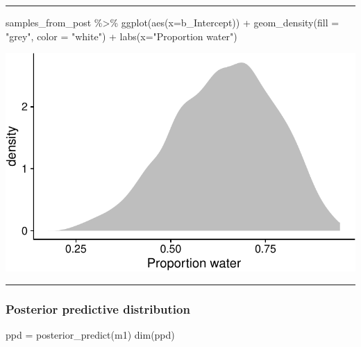 \documentclass[
  letterpaper,
  DIV=11,
  numbers=noendperiod]{scrartcl}
\newenvironment{Shaded}{\begin{snugshade}}{\end{snugshade}}
\newcommand{\AttributeTok}[1]{\textcolor[rgb]{0.40,0.45,0.13}{#1}}
\newcommand{\FunctionTok}[1]{\textcolor[rgb]{0.28,0.35,0.67}{#1}}
\newcommand{\NormalTok}[1]{\textcolor[rgb]{0.00,0.23,0.31}{#1}}
\newcommand{\OtherTok}[1]{\textcolor[rgb]{0.00,0.23,0.31}{#1}}
\newcommand{\SpecialCharTok}[1]{\textcolor[rgb]{0.37,0.37,0.37}{#1}}
\newcommand{\StringTok}[1]{\textcolor[rgb]{0.13,0.47,0.30}{#1}}
\begin{document}
\begin{center}\rule{0.5\linewidth}{0.5pt}\end{center}

\begin{Shaded}
\begin{Highlighting}[]
\NormalTok{samples\_from\_post }\SpecialCharTok{\%\textgreater{}\%}  
  \FunctionTok{ggplot}\NormalTok{(}\FunctionTok{aes}\NormalTok{(}\AttributeTok{x=}\NormalTok{b\_Intercept)) }\SpecialCharTok{+}
  \FunctionTok{geom\_density}\NormalTok{(}\AttributeTok{fill =} \StringTok{"grey"}\NormalTok{, }\AttributeTok{color =} \StringTok{"white"}\NormalTok{) }\SpecialCharTok{+}
  \FunctionTok{labs}\NormalTok{(}\AttributeTok{x=}\StringTok{"Proportion water"}\NormalTok{)}
\end{Highlighting}
\end{Shaded}

\includegraphics[width=17.1875in,height=\textheight]{lecture02-1_files/figure-pdf/unnamed-chunk-6-1.pdf}

\begin{center}\rule{0.5\linewidth}{0.5pt}\end{center}

\subsubsection{Posterior predictive
distribution}\label{posterior-predictive-distribution}

\begin{Shaded}
\begin{Highlighting}[]
\NormalTok{ppd }\OtherTok{=} \FunctionTok{posterior\_predict}\NormalTok{(m1)}
\FunctionTok{dim}\NormalTok{(ppd)}
\end{Highlighting}
\end{Shaded}
\end{document}
